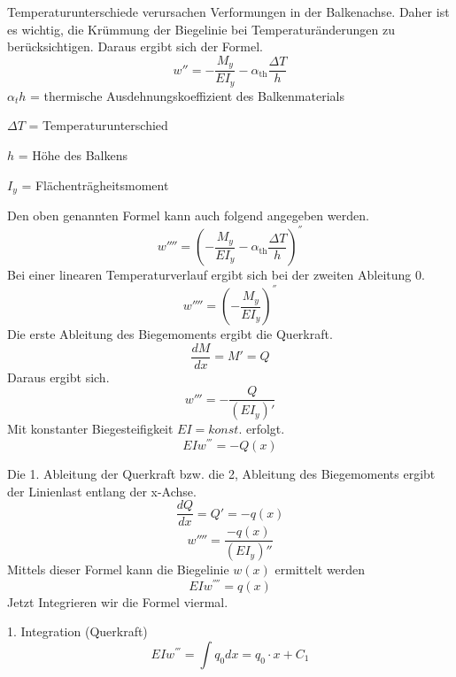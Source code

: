 Temperaturunterschiede verursachen Verformungen in der Balkenachse.
Daher ist es wichtig, die Krümmung der Biegelinie bei Temperaturänderungen zu berücksichtigen.
Daraus ergibt sich der Formel.
\begin{equation}
	w''=
	-\frac{M_y}{EI_y}-\alpha_{\text{th}}\frac{\Delta T}{h}
\end{equation}
$α_th$ = thermische Ausdehnungskoeffizient des Balkenmaterials

$ΔT$ = Temperaturunterschied

$h$ = Höhe des Balkens

$I_y$ = Flächenträgheitsmoment

Den oben genannten Formel kann auch folgend angegeben werden.
\begin{equation}
	w''''=
	\left(-\frac{M_y}{EI_y}-\alpha_{\text{th}}\frac{\Delta T}{h}\right)^{''}
\end{equation}
Bei einer linearen Temperaturverlauf ergibt sich bei der zweiten Ableitung 0.
\begin{equation}
	w''''=
	\left(-\frac{M_y}{EI_y}\right)^{''}
\end{equation}
Die erste Ableitung des Biegemoments ergibt die Querkraft.
\begin{equation}
	\frac{dM}{dx}=
	M'=
	Q
\end{equation}
Daraus ergibt sich.
\begin{equation}
	w'''=
	-\frac{Q}{(EI_y)'}
\end{equation}
Mit konstanter Biegesteifigkeit $EI = konst.$ erfolgt.
\begin{equation}
	EIw^{'''}=
	-Q\left(x\right)
\end{equation}

Die 1. Ableitung der Querkraft bzw. die 2, Ableitung des Biegemoments ergibt der Linienlast entlang der x-Achse.
\begin{equation}
	\frac{dQ}{dx}=
	Q'=
	-q(x)
\end{equation}
\begin{equation}
	w''''=
	\frac{-q(x)}{(EI_y)''}
\end{equation}
Mittels dieser Formel kann die Biegelinie $w(x)$ ermittelt werden
\begin{equation}
	EIw^{''''}=
	q\left(x\right) 
\end{equation}
Jetzt Integrieren wir die Formel viermal.

1. Integration (Querkraft)
\begin{equation}
	EIw^{'''}=
	\int q_0dx=
	q_0\cdot x+C_1
\end{equation}

